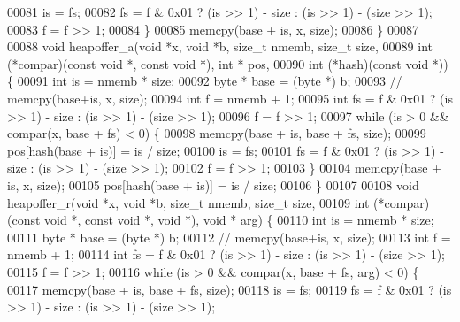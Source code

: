\begin{DoxyCode}
00081                 is = fs;
00082                 fs = f & 0x01 ? (is >> 1) - size : (is >> 1) - (size >> 1);
00083                 f = f >> 1;
00084         \}
00085         memcpy(base + is, x, size);
00086 \}
00087 
00088 \textcolor{keywordtype}{void} heapoffer\_a(\textcolor{keywordtype}{void} *x, \textcolor{keywordtype}{void} *b, \textcolor{keywordtype}{size\_t} nmemb, \textcolor{keywordtype}{size\_t} size,
00089                 \textcolor{keywordtype}{int} (*compar)(\textcolor{keyword}{const} \textcolor{keywordtype}{void} *, \textcolor{keyword}{const} \textcolor{keywordtype}{void} *), \textcolor{keywordtype}{int} * pos,
00090                 \textcolor{keywordtype}{int} (*hash)(\textcolor{keyword}{const} \textcolor{keywordtype}{void} *)) \{
00091         \textcolor{keywordtype}{int} is = nmemb * size;
00092         byte * base = (byte *) b;
00093 \textcolor{comment}{//      memcpy(base+is, x, size);}
00094         \textcolor{keywordtype}{int} f = nmemb + 1;
00095         \textcolor{keywordtype}{int} fs = f & 0x01 ? (is >> 1) - size : (is >> 1) - (size >> 1);
00096         f = f >> 1;
00097         \textcolor{keywordflow}{while} (is > 0 && compar(x, base + fs) < 0) \{
00098                 memcpy(base + is, base + fs, size);
00099                 pos[hash(base + is)] = is / size;
00100                 is = fs;
00101                 fs = f & 0x01 ? (is >> 1) - size : (is >> 1) - (size >> 1);
00102                 f = f >> 1;
00103         \}
00104         memcpy(base + is, x, size);
00105         pos[hash(base + is)] = is / size;
00106 \}
00107 
00108 \textcolor{keywordtype}{void} heapoffer\_r(\textcolor{keywordtype}{void} *x, \textcolor{keywordtype}{void} *b, \textcolor{keywordtype}{size\_t} nmemb, \textcolor{keywordtype}{size\_t} size,
00109                 \textcolor{keywordtype}{int} (*compar)(\textcolor{keyword}{const} \textcolor{keywordtype}{void} *, \textcolor{keyword}{const} \textcolor{keywordtype}{void} *, \textcolor{keywordtype}{void} *), \textcolor{keywordtype}{void} * arg) \{
00110         \textcolor{keywordtype}{int} is = nmemb * size;
00111         byte * base = (byte *) b;
00112 \textcolor{comment}{//      memcpy(base+is, x, size);}
00113         \textcolor{keywordtype}{int} f = nmemb + 1;
00114         \textcolor{keywordtype}{int} fs = f & 0x01 ? (is >> 1) - size : (is >> 1) - (size >> 1);
00115         f = f >> 1;
00116         \textcolor{keywordflow}{while} (is > 0 && compar(x, base + fs, arg) < 0) \{
00117                 memcpy(base + is, base + fs, size);
00118                 is = fs;
00119                 fs = f & 0x01 ? (is >> 1) - size : (is >> 1) - (size >> 1);

\end{DoxyCode}
